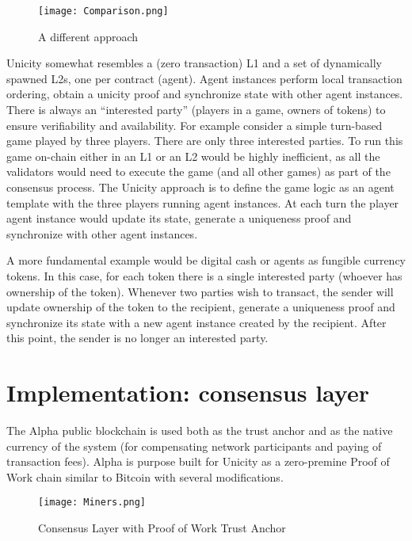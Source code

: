 \documentclass{article}
\begin{document}
\begin{figure}[htbp]
    \centering
    \texttt{[image: Comparison.png]}
    \caption{A different approach}
    \label{fig:comp}
\end{figure}

Unicity somewhat resembles a (zero transaction) L1 and a set of dynamically spawned L2s, one per contract (agent). Agent instances perform local transaction ordering, obtain a unicity proof and synchronize state with other agent instances. There is always an ``interested party'' (players in a game, owners of tokens) to ensure verifiability and availability. For example consider a simple turn-based game played by three players. There are only three interested parties. To run this game on-chain either in an L1 or an L2 would be highly inefficient, as all the validators would need to execute the game (and all other games) as part of the consensus process. The Unicity approach is to define the game logic as an agent template with the three players running agent instances. At each turn the player agent instance would update its state, generate a uniqueness proof and synchronize with other agent instances.



 A more fundamental example would be digital cash or agents as fungible currency tokens. In this case, for each token there is a single interested party (whoever has ownership of the token). Whenever two parties wish to transact, the sender will update ownership of the token to the recipient, generate a uniqueness proof and synchronize its state with a new agent instance created by the recipient. After this point, the sender is no longer an interested party.


\section{Implementation: consensus layer}

The Alpha public blockchain is used both as the trust anchor and as the native currency of the system (for compensating network participants and paying of transaction fees). Alpha is purpose built for Unicity as a zero-premine Proof of Work chain similar to Bitcoin with several modifications.

\begin{figure}[htbp]
    \centering
    \texttt{[image: Miners.png]}
    \caption{Consensus Layer with Proof of Work Trust Anchor}
    \label{fig:miners}
\end{figure}
\end{document}
